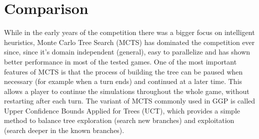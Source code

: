 \section{Comparison}
While in the early years of the competition there was a bigger focus on intelligent heuristics, Monte Carlo Tree Search (MCTS) has dominated the competition ever since, since it’s domain independent (general), easy to parallelize and has shown better performance in most of the tested games. One of the most important features of MCTS is that the process of building the tree can be paused when necessary (for example when a turn ends) and continued at a later time. This allows a player to continue the simulations throughout the whole game, without restarting after each turn.
The variant of MCTS commonly used in GGP is called Upper Confidence Bounds Applied for Trees (UCT), which provides a simple method to balance tree exploration (search new branches) and exploitation (search deeper in the known branches).

